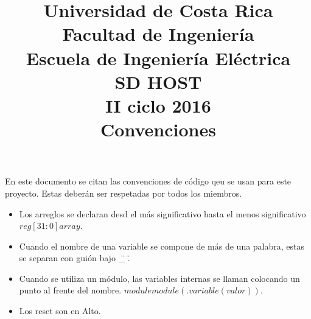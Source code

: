 

\title{Universidad de Costa Rica\\{\small Facultad de Ingeniería\\Escuela de Ingeniería
    Eléctrica\\SD HOST\\II ciclo 2016\\\vspace*{0.55in} Convenciones}}





En este documento se citan las convenciones de código qeu se usan para este proyecto. Estas deberán
ser respetadas por todos los miembros. 

\begin{itemize}
\item Los arreglos se declaran desd el más significativo hasta el menos significativo $reg [31:0] array$.
\item Cuando el nombre de una variable se compone de más de una palabra, estas se separan con guión
  bajo \"\_ \".
\item Cuando se utiliza un módulo, las variables internas se llaman colocando un punto al frente del
  nombre. $module module(.variable(valor))$. 
\item Los reset son en Alto.
\end{itemize}
\newpage


\grid
